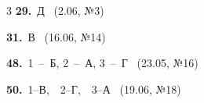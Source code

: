 \documentclass[12pt]{article}
\begin{document}
\ifshowsolutions
{}
\begin{multicols}{3}\noindent
\noindent\textbf{29.}~Д \ {\scriptsize\color{gray}(2.06, №3)}\par
\noindent\textbf{31.}~В \ {\scriptsize\color{gray}(16.06, №14)}\par
\noindent\textbf{48.}~1~--~Б, 2~--~А, 3~--~Г \ {\scriptsize\color{gray}(23.05, №16)}\par
\noindent\textbf{50.}~1--В,\ \ 2--Г,\ \ 3--А \ {\scriptsize\color{gray}(19.06, №18)}\par
\end{multicols}
\fi

\endgroup
\end{document}
